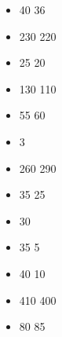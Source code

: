 \begin{itemize}
		\item \warriorknights{} \extramodel{} 40 \costdown{} 36
		\item \turul{} 230 \costdown{} 220
		\item \turul{} \territorialhunter{} 25 \costdown{} 20
		\item \karkadanherd{}  130 \costdown{} 110
		\item \karkadanherd{} \extramodel{} 55 \costup{} 60
		\item \karkadanherd{} \karkadanbulls{} 3 \costdown{} \free{}
		\item \nomadicgiant{} 260 \costup{} 290
		\item \nomadicgiant{} \bigbrother{} 35 \costdown{} 25
		\item \nomadicgiant{} \giantclub{} 30 \costdown{} \free{}
		\item \nomadicgiant{} \giantrecurvebow{} 35 \costdown{} 5
		\item \nomadicgiant{} \tribalwarspear{} 40 \costdown{} 10
		\item \steppemammoth{} 410 \costdown{} 400
		\item \steppemammoth{} \rallyaroundtheflag{} 80 \costup{} 85
	\end{itemize}
